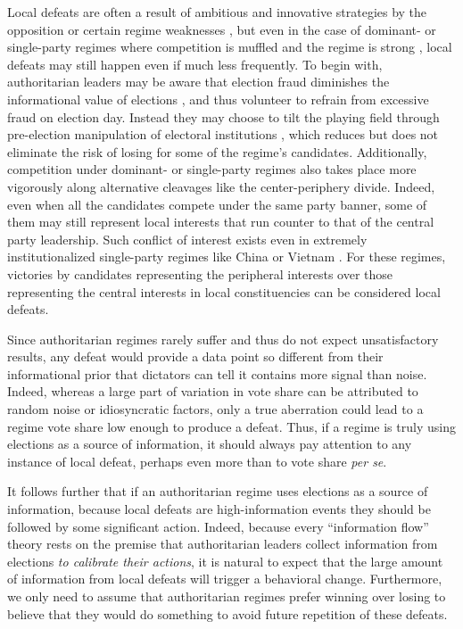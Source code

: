 \documentclass[12pt]{article}\usepackage[]{graphicx}\usepackage[]{color}
\newcommand{\1}{\mathbbm{1}}
\begin{document}
Local defeats are often a result of ambitious and innovative strategies by the opposition \citep{BunceWolchik2010} or certain regime weaknesses \citep{LevistkyWay2010}, but even in the case of dominant- or single-party regimes where competition is muffled \citep{Schedler2002} and the regime is strong \citep{BunceWolchik2010}, local defeats may still happen even if much less frequently. To begin with, authoritarian leaders may be aware that election fraud diminishes the informational value of elections \citep{Wintrobe2000}, and thus volunteer to refrain from excessive fraud on election day. Instead they may choose to tilt the playing field through pre-election manipulation of electoral institutions \citep{DiazMagaloni2001, Pepinsky2009, MaleskySchuler2011}, which reduces but does not eliminate the risk of losing for some of the regime's candidates. Additionally, competition under dominant- or single-party regimes also takes place more vigorously along alternative cleavages like the center-periphery divide. Indeed, even when all the candidates compete under the same party banner, some of them may still represent local interests that run counter to that of the central party leadership. Such conflict of interest exists even in extremely institutionalized single-party regimes like China \citep{Manion2014} or Vietnam \citep{MaleskySchuler2011}. For these regimes, victories by candidates representing the peripheral interests over those representing the central interests in local constituencies can be considered local defeats.
	
Since authoritarian regimes rarely suffer and thus do not expect unsatisfactory results, any defeat would provide a data point so different from their informational prior that dictators can tell it contains more signal than noise. Indeed, whereas a large part of variation in vote share can be attributed to random noise or idiosyncratic factors, only a true aberration could lead to a regime vote share low enough to produce a defeat. Thus, if a regime is truly using elections as a source of information, it should always pay attention to any instance of local defeat, perhaps even more than to vote share \textit{per se}.

It follows further that if an authoritarian regime uses elections as a source of information, because local defeats are high-information events they should be followed by some significant action. Indeed, because every ``information flow'' theory rests on the premise that authoritarian leaders collect information from elections \textit{to calibrate their actions}, it is natural to expect that the large amount of information from local defeats will trigger a behavioral change. Furthermore, we only need to assume that authoritarian regimes prefer winning over losing to believe that they would do something to avoid future repetition of these defeats. 
\end{document}
